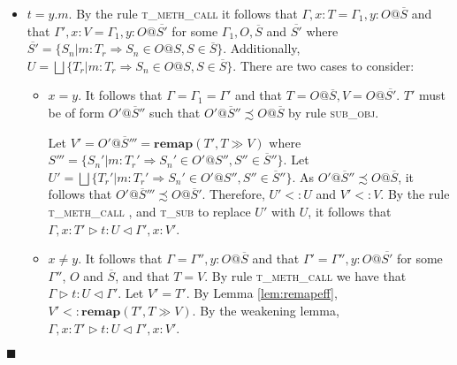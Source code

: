 \documentclass[preprint]{sigplanconf}
\newcommand{\lemref}[1]{Lemma \ref{#1}}
\newcommand{\tfunc}{\textsc{t\_fun\_call} }
\newcommand{\tmethc}{\textsc{t\_meth\_call} }
\newcommand{\tsub}{\textsc{t\_sub} }
\newcommand{\subobj}{\textsc{sub\_obj}}
\newcommand{\remapapp}[3]{\ensuremath{\mathbf{remap}(#1, #2 \gg #3)}}
\newcommand{\typerule}[4]{#1 \triangleright #2 : #3 \triangleleft #4}
\newcommand{\funt}[3]{(\overline{#1 \gg #2}) \rightarrow #3}
\newcommand{\qed}{$\blacksquare$}
\newenvironment{proof}{\vspace{1ex}\noindent{\bf Proof}\hspace{0.5em}}
  {\hfill\qed\vspace{1ex}}
\begin{document}
\begin{proof}
\begin{itemize}
\begin{itemize}
\item $x = y$, meaning $\Gamma = \Gamma_1, \overline{z_i : T_i}$ and
$\Gamma' = \Gamma_1, \overline{z_i : T_i'}$. 
Additionally, $T = V = \funt{U_i}{V_i}{U}$.
$T'$ must therefore be of form $\funt{U_i'}{V_i'}{U'}$ 
such that for each $i$, $U_i <: U_i'$, $V_i' <: V_i$, $U' <: U$ by the
definition of subtyping. Let $V' = T'$.
By \lemref{lem:remapeff}, $V' <: \remapapp{T'}{T}{V}$.
It follows by rule \tfunc, and \tsub to replace $U'$ with $U$, that
$\typerule{\Gamma, x : T'}{t}{U}{\Gamma', x : V'}$.

\item $x \in \overline{z_i}$, meaning that $T = T_i$ and 
$V = T_i' = \remapapp{T}{U_i}{V_i}$ for some $i$.
Let $V' = \remapapp{T'}{U_i}{V_i}$. 
By \lemref{lem:remapcv}, $V' <: V$.
As $T' <: T$, we can type $t$ by rule \tfunc such that
$\typerule{\Gamma, x : T'}{t}{U}{\Gamma, x : V'}$.

\end{itemize}

\item $t = y.m$. By the rule \tmethc it follows that
$\Gamma, x : T = \Gamma_1, y : O@\overline{S}$
and that
$\Gamma', x : V = \Gamma_1, y : O@\overline{S'}$
for some $\Gamma_1, O, \overline{S}$ and $\overline{S'}$
where
$\overline{S'} = \{ S_n | m : T_r \Rightarrow S_n \in O@S, S \in \overline{S} \}$.
Additionally, 
$U = \bigsqcup{ \{ T_r | m : T_r \Rightarrow S_n \in O@S, S \in \overline{S} \} }$.
There are two cases to consider:

\begin{itemize}
\item $x = y$. It follows that $\Gamma = \Gamma_1 = \Gamma'$ and
that $T = O@\overline{S}, V = O@\overline{S'}$.
$T'$ must be of form $O'@\overline{S}''$ such that
$O'@\overline{S}'' \precsim O@\overline{S}$ by rule \subobj.

Let $V' = O'@\overline{S}''' = \remapapp{T'}{T}{V}$
where
$S''' = \{ S_n' | m : T_r' \Rightarrow S_n' \in O'@S'', S'' \in \overline{S}''\}$.
Let $U' = \bigsqcup{ \{ T_r' | m : T_r' \Rightarrow S_n' \in O'@S'', S'' \in \overline{S}'' \} }$.
As $O'@\overline{S}'' \precsim O@\overline{S}$, it follows that
$O'@\overline{S}''' \precsim O@\overline{S}'$.
Therefore, $U' <: U$ and $V' <: V$. By the rule \tmethc, and \tsub
to replace $U'$ with $U$, it follows that
$\typerule{\Gamma, x : T'}{t}{U}{\Gamma', x : V'}$.

\item $x \neq y$. It follows that $\Gamma = \Gamma'', y : O@\overline{S}$
and that $\Gamma' = \Gamma'', y : O@\overline{S'}$
for some $\Gamma''$, $O$ and $\overline{S}$, and that
$T = V$.
By rule \tmethc we have that $\typerule{\Gamma}{t}{U}{\Gamma'}$.
Let $V' = T'$. By \lemref{lem:remapeff}, $V' <: \remapapp{T'}{T}{V}$.
By the weakening lemma, 
$\typerule{\Gamma, x : T'}{t}{U}{\Gamma', x : V'}$.


\end{itemize}
\end{itemize}
\end{proof}
\end{document}
